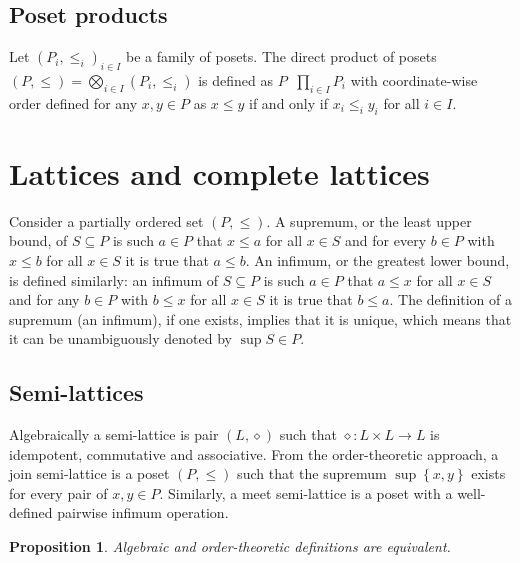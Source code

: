 \documentclass[a4paper]{article}
\newcommand{\obj}[1]{{\left\{ #1 \right \}}}
\newcommand{\brac}[1]{{\left ( #1 \right )}}
\newtheorem{prop}{Proposition}
\newcommand{\defn}{\mathop{\overset{\Delta}{=}}\nolimits}
\begin{document}

\subsection{Poset products} %
\label{sub:poset_products}

Let $\brac{P_i, \leq_i}_{i\in I}$ be a family of posets. The direct product of posets $(P,\leq) = \bigotimes_{i\in I} (P_i,\leq_i)$ is defined as $P\defn \prod_{i\in I} P_i$ with coordinate-wise order defined for any $x,y\in P$ as $x\leq y$ if and only if $x_i\leq_i y_i$ for all $i\in I$.



\section{Lattices and complete lattices} %
\label{sec:lattices_and_complete_lattices}

Consider a partially ordered set $(P, \leq)$. A supremum, or the least upper bound, of $S\subseteq P$ is such $a\in P$ that $x\leq a$ for all $x\in S$ and for every $b\in P$ with $x\leq b$ for all $x\in S$ it is true that $a\leq b$. An infimum, or the greatest lower bound, is defined similarly: an infimum of $S\subseteq P$ is such $a\in P$ that $a\leq x$ for all $x\in S$ and for any $b\in P$ with $b\leq x$ for all $x\in S$ it is true that $b\leq a$. The definition of a supremum (an infimum), if one exists, implies that it is unique, which means that it can be unambiguously denoted by $\sup S\in P$.

\subsection{Semi-lattices} %
\label{sub:semi_lattices}

Algebraically a semi-lattice is pair $(L, \diamond)$ such that $\diamond: L\times L \to L$ is idempotent, commutative and associative. From the order-theoretic approach, a join semi-lattice is a poset $(P, \leq)$ such that the supremum $\sup\obj{x, y}$ exists for every pair of $x, y \in P$. Similarly, a meet semi-lattice is a poset with a well-defined pairwise infimum operation.

\begin{prop} Algebraic and order-theoretic definitions are equivalent.
\end{prop}
\end{document}
